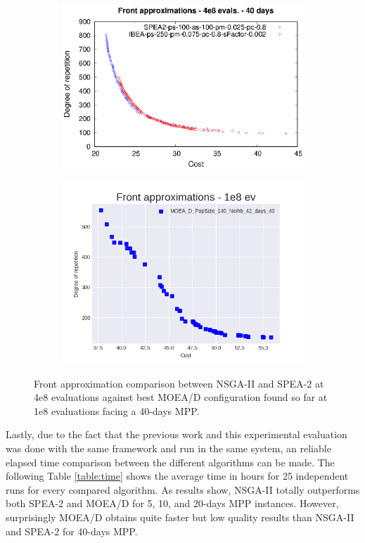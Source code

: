 \begin{figure}[H]
\begin{subfigure}{.5\textwidth}
  \centering
  \includegraphics[width=1.0\linewidth]{../references/fronts_40days.eps}
\end{subfigure}%
\begin{subfigure}{.5\textwidth}
  \centering
  \includegraphics[width=1.0\linewidth]{../experiments/plots/fronts/40_days/MOEA_D_PopSize_140_Neihb_42_days_40_10.png}
\end{subfigure}
\caption{Front approximation comparison between NSGA-II and SPEA-2 at 4e8 evaluations against best MOEA/D configuration found so far at 1e8 evaluations facing a 40-days MPP.}
\label{fig:front_comp_3}
\end{figure}

Lastly, due to the fact that the previous work and this experimental evaluation was done with the same framework and run in the same system, an reliable elapsed time comparison between the different algorithms can be made. The following Table \ref{table:time} shows the average time in hours for 25 independent runs for every compared algorithm. As results show, NSGA-II totally outperforms both SPEA-2 and MOEA/D for 5, 10, and 20-days MPP instances. However, surprisingly MOEA/D obtains quite faster but low quality results than NSGA-II and SPEA-2 for 40-days MPP.
 
